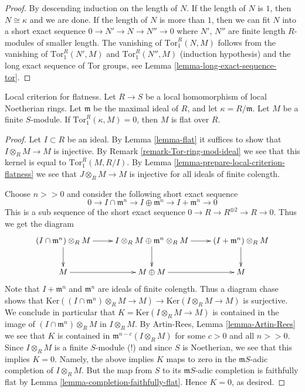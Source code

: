 \begin{proof}
By descending induction on the length of $N$.
If the length of $N$ is $1$, then $N \cong \kappa$
and we are done. If the length of $N$ is more than
$1$, then we can fit $N$ into a short exact sequence
$0 \to N' \to N \to N'' \to 0$ where $N'$, $N''$ are
finite length $R$-modules of smaller length.
The vanishing of $\text{Tor}_1^R(N, M)$ follows
from the vanishing of $\text{Tor}_1^R(N', M)$
and $\text{Tor}_1^R(N'', M)$ (induction hypothesis)
and the long exact sequence of Tor groups, see Lemma
\ref{lemma-long-exact-sequence-tor}.
\end{proof}

\begin{lemma}
\label{lemma-local-criterion-flatness}
Local criterion for flatness.
Let $R \to S$ be a local homomorphism of local Noetherian
rings. Let $\mathfrak m$ be the maximal ideal of $R$,
and let $\kappa = R/\mathfrak m$.
Let $M$ be a finite $S$-module. If $\text{Tor}_1^R(\kappa, M) = 0$,
then $M$ is flat over $R$.
\end{lemma}

\begin{proof}
Let $I \subset R$ be an ideal. By Lemma \ref{lemma-flat} it suffices
to show that $I \otimes_R M \to M$ is injective. By Remark
\ref{remark-Tor-ring-mod-ideal} we see that this kernel is
equal to $\text{Tor}_1^R(M, R/I)$. By
Lemma \ref{lemma-prepare-local-criterion-flatness}
we see that $J \otimes_R M \to M$ is injective for all ideals
of finite colength.

\medskip\noindent
Choose $n >> 0$ and consider the following short exact
sequence
$$
0
\to I \cap \mathfrak m^n
\to I \oplus \mathfrak m^n
\to I + \mathfrak m^n
\to 0
$$
This is a sub sequence of the short exact sequence
$0 \to R \to R^{\oplus 2} \to R \to 0$. Thus we get the diagram
$$
\xymatrix{
(I\cap \mathfrak m^n) \otimes_R M \ar[r] \ar[d] &
I \otimes_R M \oplus \mathfrak m^n \otimes_R M \ar[r] \ar[d] &
(I + \mathfrak m^n) \otimes_R M \ar[d] \cr
M \ar[r] &
M \oplus M \ar[r] &
M
}
$$
Note that $I + \mathfrak m^n$ and $\mathfrak m^n$
are ideals of finite colength.
Thus a diagram chase shows that
$\text{Ker}((I \cap \mathfrak m^n)\otimes_R M \to M)
\to \text{Ker}(I\otimes_R M \to M)$
is surjective. We conclude in particular that
$K = \text{Ker}(I\otimes_R M \to M)$ is contained
in the image of $(I \cap \mathfrak m^n) \otimes_R M$
in $I \otimes_R M$. By Artin-Rees, Lemma \ref{lemma-Artin-Rees}
we see that $K$ is contained
in $\mathfrak m^{n-c}(I \otimes_R M)$ for some $c > 0$
and all $n >> 0$. Since $I \otimes_R M$ is a finite
$S$-module (!) and since $S$ is Noetherian, we see
that this implies $K = 0$. Namely, the above implies
$K$ maps to zero in the $\mathfrak mS$-adic completion
of $I\otimes_R M$. But the map from $S$
to its $\mathfrak mS$-adic completion is faithfully flat
by Lemma \ref{lemma-completion-faithfully-flat}.
Hence $K = 0$, as desired.
\end{proof}

